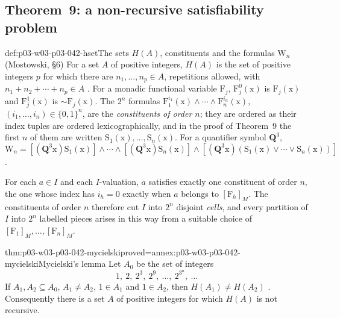 \subsection{Theorem~9: a non-recursive satisfiability problem}

\begin{hbdefinition}{def:p03-w03-p03-042-hset}{The sets \(H(A)\), constituents and the formulas \(\mathrm W_n\) (Mostowski, \S6)}
For a set \(A\) of positive integers, \(H(A)\) is the set of positive
integers \(p\) for which there are \(n_1,\ldots,n_p\in A\), repetitions
allowed, with \(n_1+n_2+\cdots+n_p\in A\) \cite[p.~28]{Mostowski1957}.
For a monadic functional variable \(\mathrm F_j\), \(\mathrm
F_j^0(\mathrm x)\) is \(\mathrm F_j(\mathrm x)\) and \(\mathrm
F_j^1(\mathrm x)\) is \({\sim}\mathrm F_j(\mathrm x)\).  The \(2^n\)
formulas \(\mathrm F_1^{i_1}(\mathrm x)\wedge\cdots\wedge\mathrm
F_n^{i_n}(\mathrm x)\), \((i_1,\ldots,i_n)\in\{0,1\}^n\), are the
\emph{constituents of order \(n\)}; they are ordered as their index
tuples are ordered lexicographically, and in the proof of Theorem~9 the
first \(n\) of them are written \(\mathrm S_1(\mathrm x),\ldots,\mathrm
S_n(\mathrm x)\).  For a quantifier symbol \(\mathbf Q^3\),
\[
 \mathrm W_n=[(\mathbf Q^3\mathrm x)\mathrm S_1(\mathrm x)]\wedge\cdots
 \wedge[(\mathbf Q^3\mathrm x)\mathrm S_n(\mathrm x)]\wedge
 [(\mathbf Q^3\mathrm x)(\mathrm S_1(\mathrm x)\vee\cdots\vee
 \mathrm S_n(\mathrm x))]
\]
\cite[p.~28]{Mostowski1957}.
\end{hbdefinition}

For each \(a\in I\) and each \(I\)-valuation, \(a\) satisfies exactly one
constituent of order \(n\), the one whose index has \(i_h=0\) exactly when
\(a\) belongs to \([\mathrm F_h]_M\).  The constituents of order \(n\)
therefore cut \(I\) into \(2^n\) disjoint \emph{cells}, and every
partition of \(I\) into \(2^n\) labelled pieces arises in this way from a
suitable choice of \([\mathrm F_1]_M,\ldots,[\mathrm F_n]_M\).

\begin{hblemma}{thm:p03-w03-p03-042-mycielski}{proved=annex:p03-w03-p03-042-mycielski}{Mycielski's lemma}
Let \(A_0\) be the set of integers
\[
 1,\ 2,\ 2^3,\ 2^9,\ \ldots,\ 2^{3^n},\ \ldots
\]
If \(A_1,A_2\subseteq A_0\), \(A_1\neq A_2\), \(1\in A_1\) and \(1\in
A_2\), then \(H(A_1)\neq H(A_2)\) \cite[p.~28]{Mostowski1957}.
Consequently there is a set \(A\) of positive integers for which \(H(A)\)
is not recursive.
\end{hblemma}

